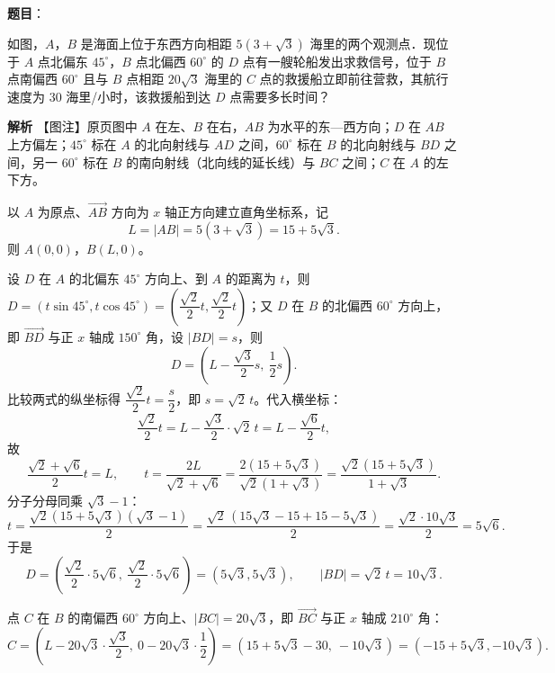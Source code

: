 \begin{answer}

\textbf{题目}：

如图，$A$，$B$ 是海面上位于东西方向相距 $5(3+\sqrt3)$ 海里的两个观测点．现位于 $A$ 点北偏东 $45^\circ$，$B$ 点北偏西 $60^\circ$ 的 $D$ 点有一艘轮船发出求救信号，位于 $B$ 点南偏西 $60^\circ$ 且与 $B$ 点相距 $20\sqrt3$ 海里的 $C$ 点的救援船立即前往营救，其航行速度为 $30$ 海里/小时，该救援船到达 $D$ 点需要多长时间？
\nopagebreak[4]
\begin{center}\end{center}
\nopagebreak[4]
\textbf{解析}
【图注】原页图中 $A$ 在左、$B$ 在右，$AB$ 为水平的东—西方向；$D$ 在 $AB$ 上方偏左；$45^\circ$ 标在 $A$ 的北向射线与 $AD$ 之间，$60^\circ$ 标在 $B$ 的北向射线与 $BD$ 之间，另一 $60^\circ$ 标在 $B$ 的南向射线（北向线的延长线）与 $BC$ 之间；$C$ 在 $A$ 的左下方。

以 $A$ 为原点、$\overrightarrow{AB}$ 方向为 $x$ 轴正方向建立直角坐标系，记
\nopagebreak[4]
\[L=|AB|=5(3+\sqrt3)=15+5\sqrt3.\]
则 $A(0,0)$，$B(L,0)$。

设 $D$ 在 $A$ 的北偏东 $45^\circ$ 方向上、到 $A$ 的距离为 $t$，则 $D=(t\sin45^\circ,t\cos45^\circ)=\left(\dfrac{\sqrt2}{2}t,\dfrac{\sqrt2}{2}t\right)$；又 $D$ 在 $B$ 的北偏西 $60^\circ$ 方向上，即 $\overrightarrow{BD}$ 与正 $x$ 轴成 $150^\circ$ 角，设 $|BD|=s$，则
\nopagebreak[4]
\[D=\left(L-\frac{\sqrt3}{2}s,\ \frac12 s\right).\]
比较两式的纵坐标得 $\dfrac{\sqrt2}{2}t=\dfrac s2$，即 $s=\sqrt2\,t$。代入横坐标：
\nopagebreak[4]
\[\frac{\sqrt2}{2}t=L-\frac{\sqrt3}{2}\cdot\sqrt2\,t=L-\frac{\sqrt6}{2}t,\]
故
\nopagebreak[4]
\[\frac{\sqrt2+\sqrt6}{2}t=L,\qquad t=\frac{2L}{\sqrt2+\sqrt6}=\frac{2(15+5\sqrt3)}{\sqrt2(1+\sqrt3)}=\frac{\sqrt2(15+5\sqrt3)}{1+\sqrt3}.\]
分子分母同乘 $\sqrt3-1$：
\nopagebreak[4]
\[t=\frac{\sqrt2(15+5\sqrt3)(\sqrt3-1)}{2}=\frac{\sqrt2\,(15\sqrt3-15+15-5\sqrt3)}{2}=\frac{\sqrt2\cdot10\sqrt3}{2}=5\sqrt6.\]
于是
\nopagebreak[4]
\[D=\left(\frac{\sqrt2}{2}\cdot 5\sqrt6,\ \frac{\sqrt2}{2}\cdot 5\sqrt6\right)=(5\sqrt3,5\sqrt3),\qquad |BD|=\sqrt2\,t=10\sqrt3.\]

点 $C$ 在 $B$ 的南偏西 $60^\circ$ 方向上、$|BC|=20\sqrt3$，即 $\overrightarrow{BC}$ 与正 $x$ 轴成 $210^\circ$ 角：
\nopagebreak[4]
\[C=\left(L-20\sqrt3\cdot\frac{\sqrt3}{2},\ 0-20\sqrt3\cdot\frac12\right)=\left(15+5\sqrt3-30,\ -10\sqrt3\right)=(-15+5\sqrt3,-10\sqrt3).\]


\end{answer}
